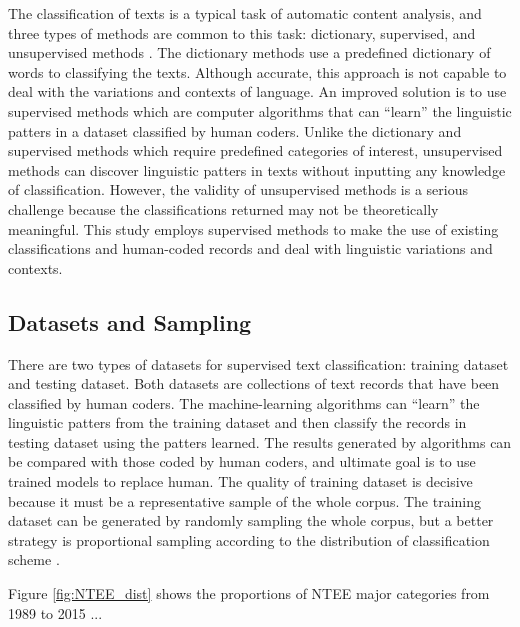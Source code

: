 \documentclass[12pt]{article}
\begin{document}
The classification of texts is a typical task of automatic content analysis, and three types of methods are common to this task: dictionary, supervised, and unsupervised methods \parencite[268-269]{GrimmerTextDataPromise2013}. The dictionary methods use a predefined dictionary of words to classifying the texts. Although accurate, this approach is not capable to deal with the variations and contexts of language. An improved solution is to use supervised methods which are computer algorithms that can ``learn'' the linguistic patters in a dataset classified by human coders. Unlike the dictionary and supervised methods which require predefined categories of interest, unsupervised methods can discover linguistic patters in texts without inputting any knowledge of classification. However, the validity of unsupervised methods is a serious challenge because the classifications returned may not be theoretically meaningful. This study employs supervised methods to make the use of existing classifications and human-coded records and deal with linguistic variations and contexts. 



\subsection{Datasets and Sampling}

There are two types of datasets for supervised text classification: training dataset and testing dataset. Both datasets are collections of text records that have been classified by human coders. The machine-learning algorithms can ``learn'' the linguistic patters from the training dataset and then classify the records in testing dataset using the patters learned. The results generated by algorithms can be compared with those coded by human coders, and ultimate goal is to use trained models to replace human. The quality of training dataset is decisive because it must be a representative sample of the whole corpus. The training dataset can be generated by randomly sampling the whole corpus, but a better strategy is proportional sampling according to the distribution of classification scheme \parencite[278]{GrimmerTextDataPromise2013}.

Figure \ref{fig:NTEE_dist} shows the proportions of NTEE major categories from 1989 to 2015 ... 
\end{document}

